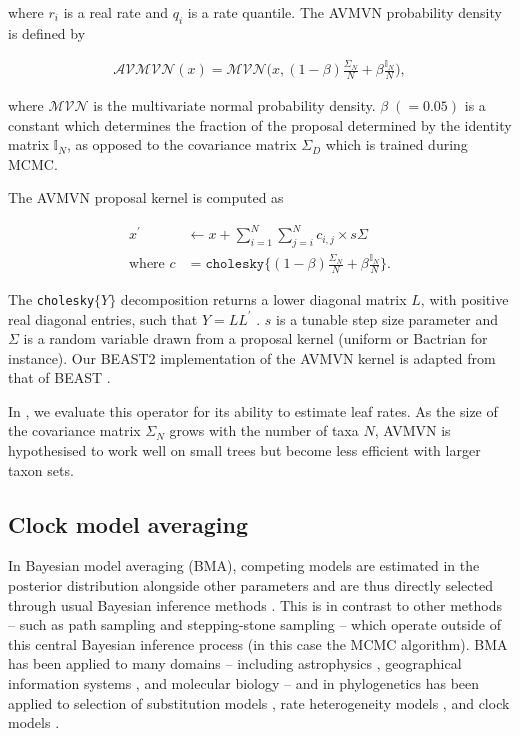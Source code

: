 \documentclass[10pt,letterpaper]{article}
\begin{document}
where $r_i$ is a real rate and $q_i$ is a rate quantile. The AVMVN probability density is defined by 


\begin{align}
	\mathcal{AVMVN}(x) =  \mathcal{MVN}\big(x, (1-\beta) \frac{\Sigma_N}{N} + \beta \frac{\mathbb{I}_N}{N} \big) ,
\end{align}


where $\mathcal{MVN}$ is the multivariate normal probability density. $\beta \; (= 0.05)$ is a constant which determines the fraction of the proposal determined by the identity matrix $\mathbb{I}_N$, as opposed to the covariance matrix $\Sigma_D$ which is trained during MCMC.

The AVMVN proposal kernel is computed as


\begin{align}
	x^\prime &\leftarrow x + \sum\limits_{i=1}^N \sum\limits_{j=i}^N c_{i,j} \times s\Sigma \\
	\text {where }  c &= \texttt{cholesky} \{ (1-\beta) \frac{\Sigma_N}{N} + \beta \frac{\mathbb{I}_N}{N} \}.
\end{align}


The \texttt{cholesky}$\{Y\}$ decomposition returns a lower diagonal matrix $L$, with positive real diagonal entries, such that $Y = LL^\prime$ \cite{lindstrom1988newton, pourahmadi2007cholesky}. $s$ is a tunable step size parameter and $\Sigma$ is a random variable drawn from a proposal kernel (uniform or Bactrian for instance). Our BEAST2 implementation of the AVMVN kernel is adapted from that of BEAST \cite{suchard2018bayesian}.





In , we evaluate this operator for its ability to estimate leaf rates. As the size of the covariance matrix $\Sigma_N$ grows with the number of taxa $N$, AVMVN is hypothesised to work well on small trees but become less efficient with larger taxon sets.


\subsection*{Clock model averaging}
\label{sect:clockModelAveraging}

In Bayesian model averaging (BMA), competing models are estimated in the posterior distribution alongside other parameters and are thus directly selected through usual Bayesian inference methods  \cite{fragoso2018bayesian}. This is in contrast to other methods -- such as path sampling \cite{lartillot2006computing} and stepping-stone sampling \cite{xie2011improving} -- which operate outside of this central Bayesian inference process (in this case the MCMC algorithm). BMA has been applied to many domains \cite{fragoso2018bayesian} -- including astrophysics \cite{parkinson2013bayesian}, geographical information systems \cite{barber2006modelling}, and molecular biology \cite{douglas2020bayesian} -- and in phylogenetics  has been applied to selection of substitution models \cite{beier2004phylogenetic,posada2008jmodeltest,bouckaert2017bmodeltest}, rate heterogeneity models \cite{bouckaert2017bmodeltest}, and clock models \cite{li2012model,baele2012accurate}.
\end{document}
